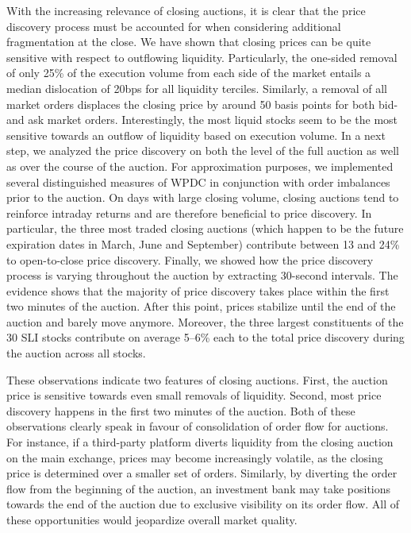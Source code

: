 \documentclass[11pt,a4paper, notitlepage]{article}
\begin{document}
	With the increasing relevance of closing auctions, it is clear that the price discovery process must be accounted for when considering additional fragmentation at the close. We have shown that closing prices can be quite sensitive with respect to outflowing liquidity. Particularly, the one-sided removal of only 25\% of the execution volume from each side of the market entails a median dislocation of 20bps for all liquidity terciles. Similarly, a removal of all market orders displaces the closing price by around 50 basis points for both bid- and ask market orders. Interestingly, the most liquid stocks seem to be the most sensitive towards an outflow of liquidity based on execution volume. In a next step, we analyzed the price discovery on both the level of the full auction as well as over the course of the auction. For approximation purposes, we implemented several distinguished measures of \acf{WPDC} in conjunction with order imbalances prior to the auction. On days with large closing volume, closing auctions tend to reinforce intraday returns and are therefore beneficial to price discovery. In particular, the three most traded closing auctions (which happen to be the future expiration dates in March, June and September) contribute between 13 and 24\% to open-to-close price discovery. Finally, we showed how the price discovery process is varying throughout the auction by extracting 30-second intervals. The evidence shows that the majority of price discovery takes place within the first two minutes of the auction. After this point, prices stabilize until the end of the auction and barely move anymore. Moreover, the three largest constituents of the 30 \ac{SLI} stocks contribute on average 5--6\% each to the total price discovery during the auction across all stocks.
	
	These observations indicate two features of closing auctions. First, the auction price is sensitive towards even small removals of liquidity. Second, most price discovery happens in the first two minutes of the auction. Both of these observations clearly speak in favour of consolidation of order flow for auctions. For instance, if a third-party platform diverts liquidity from the closing auction on the main exchange, prices may become increasingly volatile, as the closing price is determined over a smaller set of orders. Similarly, by diverting the order flow from the beginning of the auction, an investment bank may take positions towards the end of the auction due to exclusive visibility on its order flow. All of these opportunities would jeopardize overall market quality.
	
\end{document}
